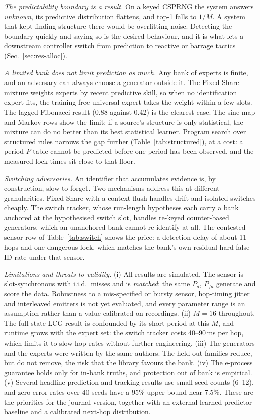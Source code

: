 \emph{The predictability boundary is a result.} On a keyed CSPRNG the system
answers \emph{unknown}, its predictive distribution flattens, and top-1 falls
to $1/M$. A system that kept finding structure there would be overfitting
noise. Detecting the boundary quickly and saying so is the desired behaviour,
and it is what lets a downstream controller switch from prediction to reactive
or barrage tactics (Sec.~\ref{sec:res-alloc}).

\emph{A limited bank does not limit prediction as much.} Any bank of experts
is finite, and an adversary can always choose a generator outside it. The
Fixed-Share mixture weights experts by recent predictive skill, so when no
identification expert fits, the training-free universal expert takes the
weight within a few slots. The lagged-Fibonacci result (0.88 against 0.42) is
the clearest case. The sine-map and Markov rows show the limit: if a source's
structure is only statistical, the mixture can do no better than its best
statistical learner. Program search over structured rules narrows the gap
further (Table~\ref{tab:structured}), at a cost: a period-$P$ table cannot be
predicted before one period has been observed, and the measured lock times sit
close to that floor.

\emph{Switching adversaries.} An identifier that accumulates evidence is, by
construction, slow to forget. Two mechanisms address this at different
granularities. Fixed-Share with a context flush handles drift and isolated
switches cheaply. The switch tracker, whose run-length hypotheses each carry a
bank anchored at the hypothesised switch slot, handles re-keyed counter-based
generators, which an unanchored bank cannot re-identify at all. The
contested-sensor row of Table~\ref{tab:switch} shows the price: a detection
delay of about 11 hops and one dangerous lock, which matches the bank's own
residual hard false-ID rate under that sensor.

\emph{Limitations and threats to validity.} (i) All results are simulated.
The sensor is slot-synchronous with i.i.d.\ misses and is \emph{matched}: the
same $P_d$, $P_{fa}$ generate and score the data. Robustness to a mis-specified
or bursty sensor, hop-timing jitter and interleaved emitters is not yet
evaluated, and every parameter range is an assumption rather than a value
calibrated on recordings. (ii) $M=16$ throughout. The full-state LCG result
is confounded by its short period at this $M$, and runtime grows with the
expert set: the switch tracker costs 40--90\,ms per hop, which limits it to
slow hop rates without further engineering. (iii) The generators and the
experts were written by the same authors. The held-out families reduce, but do
not remove, the risk that the library favours the bank. (iv) The e-process
guarantee holds only for in-bank truths, and protection out of bank is
empirical. (v) Several headline prediction and tracking results use small seed
counts (6--12), and zero error rates over 40 seeds have a 95\% upper bound
near 7.5\%. These are the priorities for the journal version, together with
an external learned predictor baseline and a calibrated next-hop
distribution.
